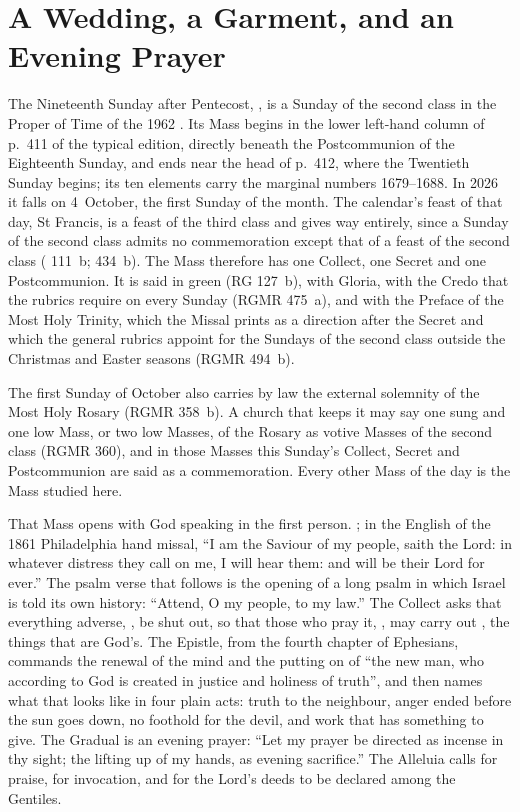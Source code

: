 \section{A Wedding, a Garment, and an Evening Prayer}
\label{sec:opening}

The Nineteenth Sunday after Pentecost, , is a Sunday of the second class in the Proper of Time of the 1962
. Its Mass begins in the lower left-hand column of
p.~411 of the typical edition, directly beneath the Postcommunion of the
Eighteenth Sunday, and ends near the head of p.~412, where the Twentieth
Sunday begins; its ten elements carry the marginal numbers 1679--1688. In
2026 it falls on 4~October, the first Sunday of the month. The calendar's
feast of that day, St Francis, is a feast of the third class and gives way
entirely, since a Sunday of the second class admits no commemoration except
that of a feast of the second class ( 111~b;
 434~b). The Mass therefore has one Collect,
one Secret and one Postcommunion. It is said in green (RG 127~b), with Gloria,
with the Credo that the rubrics require on every Sunday (RGMR 475~a), and with the Preface of the Most Holy Trinity, which
the Missal prints as a direction after the Secret and which the general rubrics
appoint for the Sundays of the second class outside the Christmas and Easter
seasons (RGMR 494~b).

The first Sunday of October also carries by law the external solemnity of the
Most Holy Rosary (RGMR 358~b). A church that keeps it may say one sung and one
low Mass, or two low Masses, of the Rosary as votive Masses of the second class
(RGMR 360), and in those Masses this Sunday's Collect, Secret and Postcommunion
are said as a commemoration. Every other Mass of the day is the Mass studied
here.

That Mass opens with God speaking in the first person. ; in the English of the 1861 Philadelphia hand missal, ``I am
the Saviour of my people, saith the Lord: in whatever distress they call on me,
I will hear them: and will be their Lord for ever.'' The psalm verse that
follows is the opening of a long psalm in which Israel is told its own history:
``Attend, O my people, to my law.'' The Collect asks that everything adverse,
, be shut out, so that those who pray it,
, may carry out ,
the things that are God's. The
Epistle, from the fourth chapter of Ephesians, commands the renewal of the mind
and the putting on of ``the new man, who according to God is created in
justice and holiness of truth'', and then names what that looks like in four
plain acts: truth to the neighbour, anger ended before the sun goes down, no
foothold for the devil, and work that has something to give. The Gradual is an
evening prayer: ``Let my prayer be directed as incense in thy sight; the
lifting up of my hands, as evening sacrifice.'' The Alleluia calls for praise,
for invocation, and for the Lord's deeds to be declared among the Gentiles.

